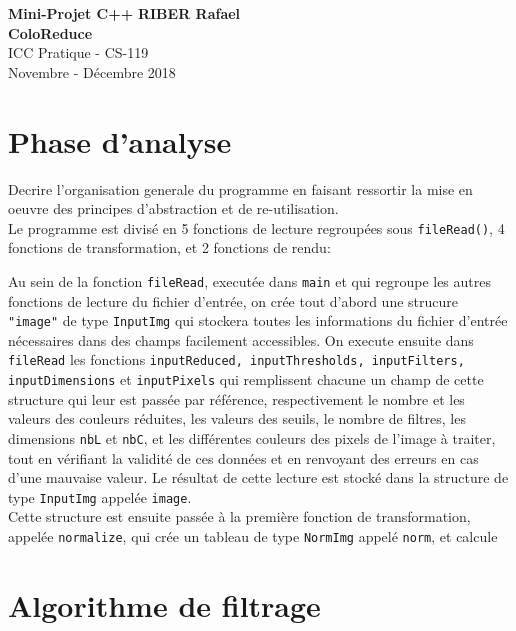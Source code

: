 \documentclass[a4paper, 11pt]{article}
\begin{document}
\noindent
\large\textbf{Mini-Projet C++} \hfill \textbf{RIBER Rafael} \\
\large\textbf{ColoReduce}\\
\normalsize ICC Pratique - CS-119\\
\hfill Novembre - Décembre 2018

\section*{Phase d'analyse}
Decrire l’organisation generale du programme en faisant ressortir la mise en oeuvre des principes d’abstraction et de re-utilisation.\\

Le programme est divisé en 5 fonctions de lecture regroupées sous \texttt{fileRead()}, 4 fonctions de transformation, et 2 fonctions de rendu:

Au sein de la fonction \texttt{fileRead}, executée dans \texttt{main} et qui regroupe les autres fonctions de lecture du fichier d'entrée, on crée tout d'abord une strucure \texttt{"image"} de type \texttt{InputImg} qui stockera toutes les informations du fichier d'entrée nécessaires dans des champs facilement accessibles. 
On execute ensuite dans \texttt{fileRead} les fonctions \texttt{inputReduced, inputThresholds, inputFilters, inputDimensions} et \texttt{inputPixels} qui remplissent chacune un champ de cette structure qui leur est passée par référence, respectivement le nombre et les valeurs des couleurs réduites, les valeurs des seuils, le nombre de filtres, les dimensions \texttt{nbL} et \texttt{nbC}, et les différentes couleurs des pixels de l'image à traiter, tout en vérifiant la validité de ces données et en renvoyant des erreurs en cas d'une mauvaise valeur. Le résultat de cette lecture est stocké dans la structure de type \texttt{InputImg} appelée \texttt{image}.\\

Cette structure est ensuite passée à la première fonction de transformation, appelée \texttt{normalize}, qui crée un tableau de type \texttt{NormImg} appelé \texttt{norm}, et calcule 

\newpage
\section*{Algorithme de filtrage}
\end{document}
